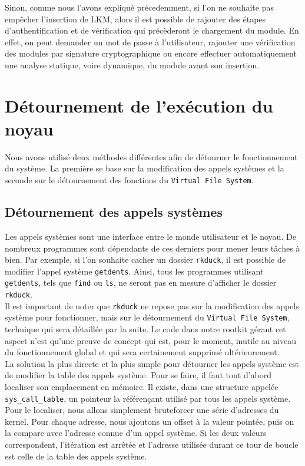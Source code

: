 \documentclass[12pt]{article}
\begin{document}
        Sinon, comme nous l'avons expliqué précedemment, si l'on ne souhaite pas empêcher l'insertion de LKM, alors il est possible de rajouter des étapes d'authentification et de vérification qui précèderont le chargement du module. En effet, on peut demander un mot de passe à l'utilisateur, rajouter une vérification des modules par signature cryptographique ou encore effectuer automatiquement une analyse statique, voire dynamique, du module avant son insertion.
    
\section{Détournement de l'exécution du noyau}  

Nous avons utilisé deux méthodes différentes afin de détourner le fonctionnement du système. La première se base sur la modification des appels systèmes et la seconde sur le détournement des fonctions du \texttt{Virtual File System}.

    \subsection{Détournement des appels systèmes}
    
        Les appels systèmes sont une interface entre le monde utilisateur et le noyau. De nombreux programmes sont dépendants de ces derniers pour mener leurs tâches à bien. Par exemple, si l'on souhaite cacher un dossier \texttt{rkduck}, il est possible de modifier l'appel système \texttt{getdents}. Ainsi, tous les programmes utilisant \texttt{getdents}, tels que \texttt{find} ou \texttt{ls}, ne seront pas en mesure d'afficher le dossier \texttt{rkduck}.\\

        Il est important de noter que \texttt{rkduck} ne repose pas sur la modification des appels système pour fonctionner, mais sur le détournement du \texttt{Virtual File System}, technique qui sera détaillée par la suite. Le code dans notre rootkit gérant cet aspect n'est qu'une preuve de concept qui est, pour le moment, inutile au niveau du fonctionnement global et qui sera certainement supprimé ultérieurement. \\

        La solution la plus directe et la plus simple pour détourner les appels système est de modifier la table des appels système\cite{turbochaos}. Pour se faire, il faut tout d'abord localiser son emplacement en mémoire. Il existe, dans une structure appelée \texttt{sys\_call\_table}, un pointeur la référençant utilisé par tous les appels système. Pour le localiser, nous allons simplement bruteforcer une série d'adresses du kernel. Pour chaque adresse, nous ajoutons un offset à la valeur pointée, puis on la compare avec l'adresse connue d'un appel système. Si les deux valeurs correspondent, l'itération est arrêtée et l'adresse utilisée durant ce tour de boucle est celle de la table des appels système.
\end{document}
